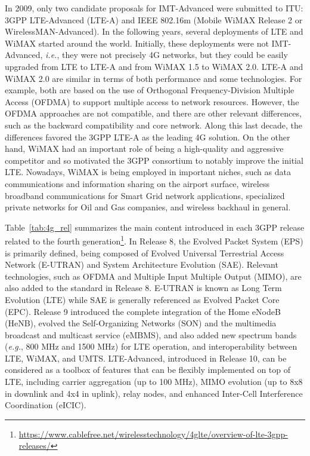 In 2009, only two candidate proposals for IMT-Advanced were submitted to ITU: 3GPP LTE-Advanced (LTE-A) and IEEE 802.16m (Mobile WiMAX Release 2 or WirelessMAN-Advanced). In the following years, several deployments of LTE and WiMAX started around the world. Initially, these deployments were not IMT-Advanced, \textit{i.e.}, they were not precisely 4G networks, but they could be easily upgraded from LTE to LTE-A and from WiMAX 1.5 to WiMAX 2.0. LTE-A and WiMAX 2.0 are similar in terms of both performance and some technologies. For example, both are based on the use of Orthogonal Frequency-Division Multiple Access (OFDMA) to support multiple access to network resources. However, the OFDMA approaches are not compatible, and there are other relevant differences, such as the backward compatibility and core network. Along this last decade, the differences favored the 3GPP LTE-A as the leading 4G solution. On the other hand, WiMAX had an important role of being a high-quality and aggressive competitor and so motivated the 3GPP consortium to notably improve the initial LTE. Nowadays, WiMAX is being employed in important niches, such as data communications and information sharing on the airport surface, wireless broadband communications for Smart Grid network applications, specialized private networks for Oil and Gas companies, and wireless backhaul in general.

Table~\ref{tab:4g_rel} summarizes the main content introduced in each 3GPP release related to the fourth generation\footnote{\url{https://www.cablefree.net/wirelesstechnology/4glte/overview-of-lte-3gpp-releases/}}. In Release 8, the Evolved Packet System (EPS) is primarily defined, being composed of  Evolved Universal Terrestrial Access Network (E-UTRAN) and System Architecture Evolution (SAE). Relevant technologies, such as OFDMA and Multiple Input Multiple Output (MIMO), are also added to the standard in Release 8. E-UTRAN is known as Long Term Evolution (LTE) while SAE is generally referenced as Evolved Packet Core (EPC). Release 9 introduced the complete integration of the Home eNodeB (HeNB), evolved the Self-Organizing Networks (SON) and the multimedia broadcast and multicast service (eMBMS), and also added new spectrum bands (\textit{e.g.}, 800 MHz and 1500 MHz) for LTE operation, and interoperability between LTE, WiMAX, and UMTS. LTE-Advanced, introduced in Release 10, can be considered as a toolbox of features that can be flexibly implemented on top of LTE, including carrier aggregation (up to 100 MHz), MIMO evolution (up to 8x8 in downlink and 4x4 in uplink), relay nodes, and enhanced Inter-Cell Interference Coordination (eICIC).

